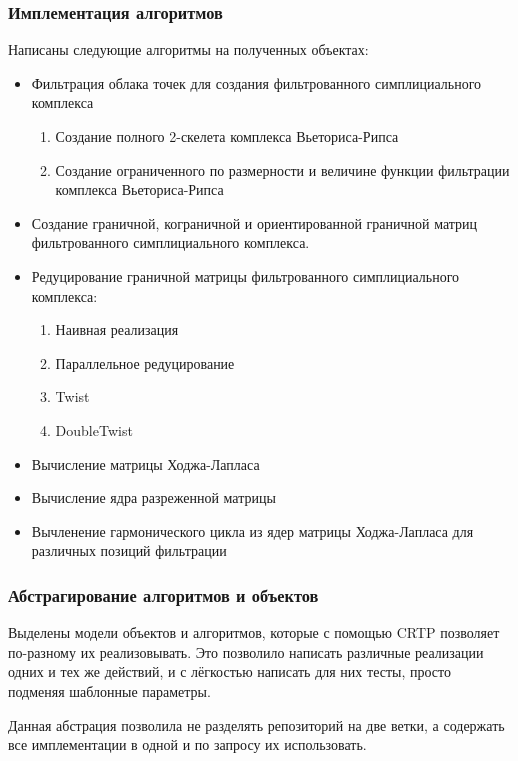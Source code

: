 \documentclass{article}
\begin{document}
\subsubsection*{Имплементация алгоритмов}
Написаны следующие алгоритмы на полученных объектах:
\begin{itemize}
  \item Фильтрация облака точек для создания фильтрованного симплициального комплекса
    \begin{enumerate}
      \item Создание полного 2-скелета комплекса Вьеториса-Рипса
      \item Создание ограниченного по размерности и величине функции фильтрации комплекса Вьеториса-Рипса \autocite{new_vr}
    \end{enumerate}
  \item Создание граничной, кограничной и ориентированной граничной матриц фильтрованного симплициального комплекса.
  \item Редуцирование граничной матрицы фильтрованного симплициального комплекса:
  \begin{enumerate}
    \item Наивная реализация
    \item Параллельное редуцирование \autocite{parallelreduce}
    \item Twist \autocite{twist}
    \item DoubleTwist \autocite{doubletwist}
  \end{enumerate}
  \item Вычисление матрицы Ходжа-Лапласа \autocite{laplacianmatrix}
  \item Вычисление ядра разреженной матрицы
  \item Вычленение гармонического цикла из ядер матрицы Ходжа-Лапласа для различных позиций фильтрации
\end{itemize}

\subsubsection*{Абстрагирование алгоритмов и объектов}
Выделены модели объектов и алгоритмов, которые с помощью CRTP позволяет по-разному их реализовывать. Это позволило написать различные реализации одних и тех же действий, и с лёгкостью написать для них тесты, просто подменяя шаблонные параметры.

Данная абстрация позволила не разделять репозиторий на две ветки, а содержать все имплементации в одной и по запросу их использовать.
\end{document}

